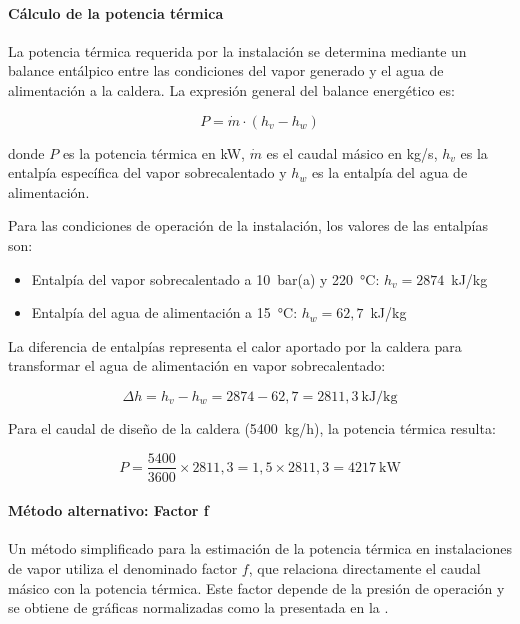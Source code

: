 \paragraph{Cálculo de la potencia térmica}

La potencia térmica requerida por la instalación se determina mediante un balance entálpico entre las condiciones del vapor generado y el agua de alimentación a la caldera. La expresión general del balance energético es:

\begin{equation}
	P = \dot{m} \cdot (h_v - h_w)
	\label{eq:potencia-termica-balance}
\end{equation}

\noindent donde $P$ es la potencia térmica en kW, $\dot{m}$ es el caudal másico en kg/s, $h_v$ es la entalpía específica del vapor sobrecalentado y $h_w$ es la entalpía del agua de alimentación.

Para las condiciones de operación de la instalación, los valores de las entalpías son:

\begin{itemize}[leftmargin=2em]
	\item Entalpía del vapor sobrecalentado a 10~bar(a) y 220~°C: $h_v = 2874$~kJ/kg
	\item Entalpía del agua de alimentación a 15~°C: $h_w = 62{,}7$~kJ/kg
\end{itemize}

La diferencia de entalpías representa el calor aportado por la caldera para transformar el agua de alimentación en vapor sobrecalentado:

\begin{equation}
	\Delta h = h_v - h_w = 2874 - 62{,}7 = 2811{,}3 \ \text{kJ/kg}
	\label{eq:diferencia-entalpias}
\end{equation}

Para el caudal de diseño de la caldera (5400~kg/h), la potencia térmica resulta:

\begin{equation}
	P = \frac{5400}{3600} \times 2811{,}3 = 1{,}5 \times 2811{,}3 = 4217 \ \text{kW}
	\label{eq:potencia-caldera}
\end{equation}

\paragraph{Método alternativo: Factor f}

Un método simplificado para la estimación de la potencia térmica en instalaciones de vapor utiliza el denominado factor $f$, que relaciona directamente el caudal másico con la potencia térmica. Este factor depende de la presión de operación y se obtiene de gráficas normalizadas como la presentada en la .

